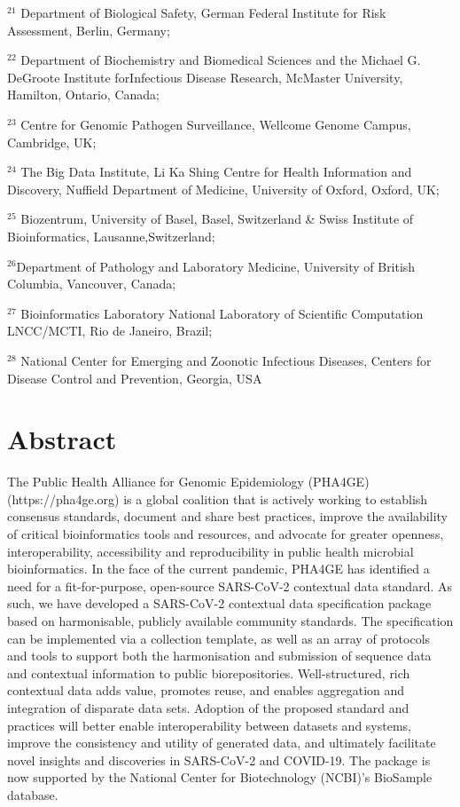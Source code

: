 $^{21}$ Department of Biological Safety, German Federal Institute for Risk Assessment, Berlin, Germany;

$^{22}$ Department of Biochemistry and Biomedical Sciences and the Michael G. DeGroote Institute forInfectious Disease Research, McMaster University, Hamilton, Ontario, Canada;

$^{23}$ Centre for Genomic Pathogen Surveillance, Wellcome Genome Campus, Cambridge, UK;

$^{24}$ The Big Data Institute, Li Ka Shing Centre for Health Information and Discovery, Nuffield Department of Medicine, University of Oxford, Oxford, UK;

$^{25}$ Biozentrum, University of Basel, Basel, Switzerland \& Swiss Institute of Bioinformatics, Lausanne,Switzerland;

$^{26}$Department of Pathology and Laboratory Medicine, University of British Columbia, Vancouver, Canada;

$^{27}$ Bioinformatics Laboratory National Laboratory of Scientific Computation LNCC/MCTI, Rio de Janeiro, Brazil;

$^{28}$ National Center for Emerging and Zoonotic Infectious Diseases, Centers for Disease Control and Prevention, Georgia, USA

\section{Abstract} \label{sec:ch7_abstract}

The Public Health Alliance for Genomic Epidemiology (PHA4GE) (https://pha4ge.org) is a global coalition that is actively working to establish consensus standards, document and share best practices, improve the availability of critical bioinformatics tools and resources, and advocate for greater openness, interoperability, accessibility and reproducibility in public health microbial bioinformatics. In the face of the current pandemic, PHA4GE has identified a need for a fit-for-purpose, open-source SARS-CoV-2 contextual data standard. As such, we have developed a SARS-CoV-2 contextual data specification package based on harmonisable, publicly available community standards. The specification can be implemented via a collection template, as well as an array of protocols and tools to support both the harmonisation and submission of sequence data and contextual information to public biorepositories. Well-structured, rich contextual data adds value, promotes reuse, and enables aggregation and integration of disparate data sets. Adoption of the proposed standard and practices will better enable interoperability between datasets and systems, improve the consistency and utility of generated data, and ultimately facilitate novel insights and discoveries in SARS-CoV-2 and COVID-19. The package is now supported by the National Center for Biotechnology (NCBI)'s BioSample database.

